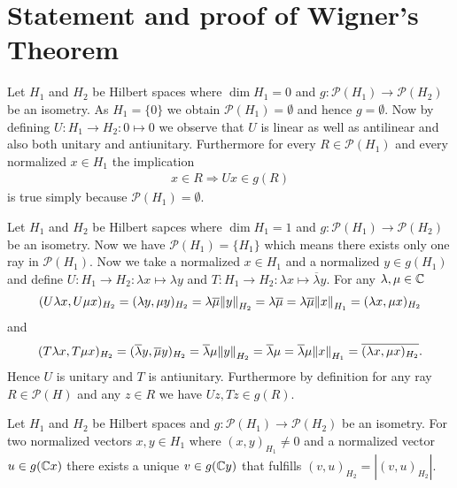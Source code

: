 \section{Statement and proof of Wigner's Theorem}

\begin{example} \label{example:zerodim}
	Let $H_1$ and $H_2$ be Hilbert spaces where $\dim H_1 = 0$ and $g: \mathcal{P}(H_1) \to \mathcal{P}(H_2)$ be an isometry. As $H_1 = \{0\}$ we obtain $\mathcal{P}(H_1) = \emptyset$ and hence $g = \emptyset$. Now by defining $U: H_1 \to H_2: 0 \mapsto 0$ we observe that $U$ is linear as well as antilinear and also both unitary and antiunitary. Furthermore for every $R \in \mathcal{P}(H_1)$ and every normalized $x \in H_1$ the implication 
	\begin{align*}
		x \in R \Rightarrow Ux \in g(R)
	\end{align*} 
	is true simply because $\mathcal{P}(H_1) = \emptyset$.
\end{example}

\begin{example} \label{example:onedim}
	Let $H_1$ and $H_2$ be Hilbert sapces where $\dim H_1 = 1$ and $g: \mathcal{P}(H_1) \to \mathcal{P}(H_2)$ be an isometry. Now we have $\mathcal{P}(H_1) = \{H_1\}$ which means there exists only one ray in $\mathcal{P}(H_1)$. Now we take a normalized $x \in H_1$ and a normalized $y \in g(H_1)$ and define $U: H_1 \to H_2: \lambda x \mapsto \lambda y$ and $T: H_1 \to H_2: \lambda x \mapsto \overline{\lambda} y$. For any $\lambda, \mu \in \C$
	\begin{align*}
		(U \lambda x, U \mu x)_{H_2} = (\lambda y, \mu y)_{H_2} = \lambda \overline{\mu} \norm[H_2]{y} = \lambda \overline{\mu} = \lambda \overline{\mu} \norm[H_1]{x} = (\lambda x, \mu x)_{H_2}
	\end{align*}
	and 
	\begin{align*}
		(T\lambda x, T \mu x)_{H_2} = (\overline{\lambda} y, \overline{\mu} y)_{H_2} = \overline{\lambda} \mu \norm[H_2]{y} = \overline{\lambda} \mu = \overline{\lambda } \mu \norm[H_1]{x} = \overline{(\lambda x, \mu x)_{H_2}}.
	\end{align*}
	Hence $U$ is unitary and $T$ is antiunitary. Furthermore by definition for any ray $R \in \mathcal{P}(H)$ and any $z \in R$ we have $Uz, Tz \in g(R)$. 
\end{example}

\begin{lemma} \label{lemma:phase_adjustment_ray}
	Let $H_1$ and $H_2$ be Hilbert spaces and $g: \mathcal{P}(H_1) \to \mathcal{P}(H_2)$ be an isometry. For two normalized vectors $x,y \in H_1$ where $(x,y)_{H_1} \neq 0$ and a normalized vector $u \in g(\C x)$ there exists a unique $v \in g(\C y)$ that fulfills $(v,u)_{H_2} = |(v,u)_{H_2}| $.
\end{lemma}

